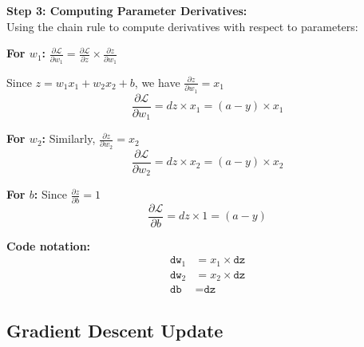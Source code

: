 \documentclass[11pt,a4paper]{article}
\theoremstyle{definition}
\theoremstyle{remark}
\begin{document}
\vspace{0.4cm}

\begin{gradcomp}
\textbf{Step 3: Computing Parameter Derivatives:} \\
Using the chain rule to compute derivatives with respect to parameters:

\textbf{For $w_1$:} $\frac{\partial \mathcal{L}}{\partial w_1} = \frac{\partial \mathcal{L}}{\partial z} \times \frac{\partial z}{\partial w_1}$

Since $z = w_1 x_1 + w_2 x_2 + b$, we have $\frac{\partial z}{\partial w_1} = x_1$
\[
\frac{\partial \mathcal{L}}{\partial w_1} = dz \times x_1 = (a - y) \times x_1
\]

\textbf{For $w_2$:} Similarly, $\frac{\partial z}{\partial w_2} = x_2$
\[
\frac{\partial \mathcal{L}}{\partial w_2} = dz \times x_2 = (a - y) \times x_2
\]

\textbf{For $b$:} Since $\frac{\partial z}{\partial b} = 1$
\[
\frac{\partial \mathcal{L}}{\partial b} = dz \times 1 = (a - y)
\]

\textbf{Code notation:}
\begin{align}
\texttt{dw}_1 &= \boxed{x_1 \times \texttt{dz}} \\
\texttt{dw}_2 &= \boxed{x_2 \times \texttt{dz}} \\
\texttt{db} &= \boxed{\texttt{dz}}
\end{align}
\end{gradcomp}

\vspace{0.4cm}

\subsection{Gradient Descent Update}
\end{document}
